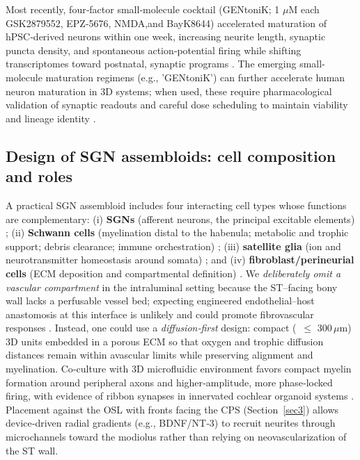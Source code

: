 \documentclass[referee,pdflatex, sn-vancouver-num]{sn-jnl}%
\theoremstyle{thmstyleone}%
\theoremstyle{thmstyletwo}%
\theoremstyle{thmstylethree}%
\begin{document}
Most recently, four‑factor small‑molecule cocktail (GENtoniK; 1 $\mu$M each GSK2879552, EPZ‑5676, NMDA,and BayK8644) accelerated maturation of hPSC‑derived neurons within one week, increasing neurite length, synaptic puncta density, and spontaneous action‑potential firing while shifting transcriptomes toward postnatal, synaptic programs \cite{Hergenreder:2024aa}. The emerging small-molecule maturation regimens (e.g., 'GENtoniK') can further accelerate human neuron maturation in 3D systems; when used, these require pharmacological validation of synaptic readouts and careful dose scheduling to maintain viability and lineage identity \citep{Hergenreder2024NatBiotech}.

\subsection{Design of SGN assembloids: cell composition and roles}
A practical SGN assembloid includes four interacting cell types whose functions are complementary: (i) \textbf{SGNs} (afferent neurons, the principal excitable elements) \cite{matsuoka_2017}; (ii) \textbf{Schwann cells} (myelination distal to the habenula; metabolic and trophic support; debris clearance; immune orchestration) \citep{Oliveira2023FrontiersPN,Moss2024iScience}; (iii) \textbf{satellite glia} (ion and neurotransmitter homeostasis around somata) \cite{Meas2018}; and (iv) \textbf{fibroblast/perineurial cells} (ECM deposition and compartmental definition) \cite{Constantin2024}. We \emph{deliberately omit a vascular compartment} in the intraluminal setting because the ST–facing bony wall lacks a perfusable vessel bed; expecting engineered endothelial–host anastomosis at this interface is unlikely and could promote fibrovascular responses \cite{Wright2018}. Instead, one could use a \emph{diffusion‑first} design: compact (~\(\leq\) 300\,\(\mu\)m) 3D units embedded in a porous ECM so that oxygen and trophic diffusion distances remain within avascular limits while preserving alignment and myelination. Co‑culture with 3D microfluidic environment favors compact myelin formation around peripheral axons and higher‑amplitude, more phase‑locked firing, with evidence of ribbon synapses in innervated cochlear organoid systems \citep{Xia2023StemCellReports}. Placement against the OSL with fronts facing the CPS (Section~\ref{sec3}) allows device‑driven radial gradients (e.g., BDNF/NT‑3) to recruit neurites through microchannels toward the modiolus rather than relying on neovascularization of the ST wall.
\end{document}
